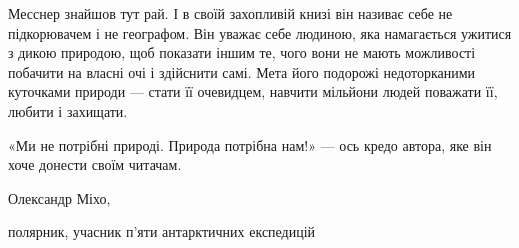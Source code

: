 Месснер знайшов тут рай. І в своїй захопливій книзі він називає себе не
підкорювачем і не географом. Він уважає себе людиною, яка намагається ужитися з
дикою природою, щоб показати іншим те, чого вони не мають можливості побачити
на власні очі і здійснити самі. Мета його подорожі недоторканими куточками
природи --- стати її очевидцем, навчити мільйони людей поважати її, любити і
захищати.

«Ми не потрібні природі. Природа потрібна нам!» --- ось кредо автора, яке він
хоче донести своїм читачам. 

Олександр Міхо,

полярник, учасник п’яти антарктичних експедицій

